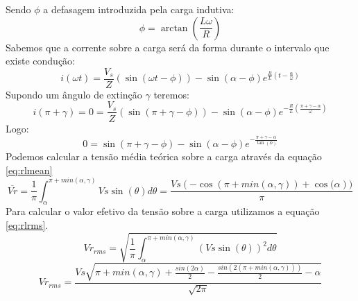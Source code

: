 \documentclass{article}
\begin{document}
Sendo $\phi$ a defasagem introduzida pela carga indutiva:
\begin{equation}
	\phi = \arctan{(\frac{L\omega}{R})}
\end{equation}
Sabemos que a corrente sobre a carga será da forma durante o intervalo que existe condução:
\begin{equation}
	i(\omega t) = \frac{V_s}{Z}(\sin(\omega t - \phi)) - \sin(\alpha - \phi)e^{\frac{R}{L}(t - \frac{\alpha}{\omega})}
\end{equation}
Supondo um ângulo de extinção $\gamma$ teremos:
\begin{equation}
i(\pi + \gamma) = 0 = \frac{V_s}{Z}(\sin(\pi + \gamma - \phi)) - \sin(\alpha - \phi)e^{-\frac{R}{L}(\frac{\pi + \gamma - \alpha}{\omega})}
\end{equation}
Logo:
\begin{equation}
 0 = \sin(\pi + \gamma - \phi) - \sin(\alpha - \phi)e^{-\frac{\pi + \gamma - \alpha}{\tan(\phi)}}
\end{equation}
Podemos calcular a tensão média teórica sobre a carga através da equação \ref{eq:rlmean}
\begin{equation}
\overline{Vr} = \frac{1}{\pi} \int_{\alpha}^{\pi + min(\alpha, \gamma)}{Vs \sin{(\theta)}d\theta} = \frac{Vs (-\cos{(\pi + min(\alpha, \gamma))} + \cos{(\alpha}))}{\pi}
\label{eq:rlmean}
\end{equation}
Para calcular o valor efetivo da tensão sobre a carga utilizamos a equação \ref{eq:rlrms}.
\begin{equation}
Vr_{rms} = \sqrt{\frac{1}{\pi} \int_{\alpha}^{\pi + min(\alpha, \gamma)}{(Vs \sin(\theta))^2 d\theta}}
\end{equation}
\begin{equation}
Vr_{rms} = \frac{Vs \sqrt{\pi + min(\alpha, \gamma) + \frac{sin(2\alpha)}{2} - \frac{sin(2(\pi + min(\alpha, \gamma)))}{2} - \alpha }}{\sqrt{2 \pi}} 
\label{eq:rlrms}
\end{equation}
\end{document}
